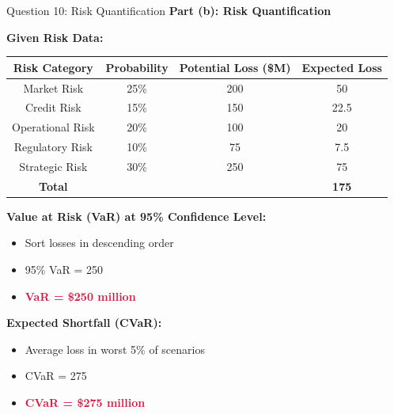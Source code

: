 \documentclass[aspectratio=169]{beamer}
\newcommand{\question}[1]{{\large\bfseries\color{crimson}#1}}
\newcommand{\highlight}[1]{\textcolor{crimson}{\textbf{#1}}}
\begin{document}
	\begin{frame}{Question 10: Risk Quantification}
		\question{Part (b): Risk Quantification}
		
		\textbf{Given Risk Data:}
		
		\begin{table}[h]
			\centering
			\begin{tabular}{|c|c|c|c|}
				\hline
				\textbf{Risk Category} & \textbf{Probability} & \textbf{Potential Loss (\$M)} & \textbf{Expected Loss} \\
				\hline
				Market Risk & 25\% & 200 & 50 \\
				Credit Risk & 15\% & 150 & 22.5 \\
				Operational Risk & 20\% & 100 & 20 \\
				Regulatory Risk & 10\% & 75 & 7.5 \\
				Strategic Risk & 30\% & 250 & 75 \\
				\hline
				\textbf{Total} & & & \textbf{175} \\
				\hline
			\end{tabular}
		\end{table}
		
		\textbf{Value at Risk (VaR) at 95\% Confidence Level:}
		\begin{itemize}
			\item Sort losses in descending order
			\item 95\% VaR = 250 
			\item \highlight{VaR = \$250 million}
		\end{itemize}
		
		\textbf{Expected Shortfall (CVaR):}
		\begin{itemize}
			\item Average loss in worst 5\% of scenarios
			\item CVaR = 275 
			\item \highlight{CVaR = \$275 million}
		\end{itemize}
	\end{frame}
	
\end{document}
